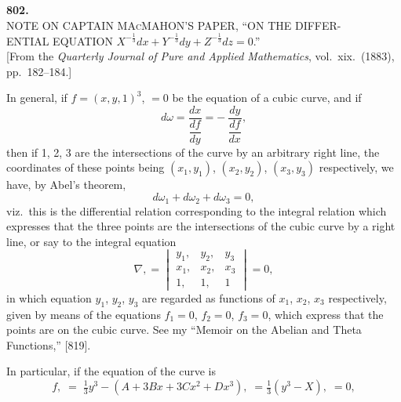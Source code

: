 \documentclass[11pt,a4paper]{article}
\begin{document}
\fancyhead[C]{\small\ }
\fancyhead[R]{\small [802}

\thispagestyle{plain}
\begin{center}
\vspace*{2em}
{\Large\bfseries 802.}\\[1.5em]
{\normalsize\scshape NOTE ON CAPTAIN MAcMAHON'S PAPER, ``ON THE DIFFER-}\\[0.3em]
{\normalsize\scshape ENTIAL EQUATION $X^{-\tfrac{1}{3}}dx + Y^{-\tfrac{1}{3}}dy + Z^{-\tfrac{1}{3}}dz = 0$.''}\\[1em]
{\small [From the \textit{Quarterly Journal of Pure and Applied Mathematics}, vol.~xix.\ (1883), pp.~182--184.]}
\end{center}

\medskip
In general, if $f = (x, y, 1)^{3}$, $= 0$ be the equation of a cubic curve, and if
\[
d\omega = \frac{dx}{\dfrac{df}{dy}} = -\,\frac{dy}{\dfrac{df}{dx}},
\]
then if 1, 2, 3 are the intersections of the curve by an arbitrary right line, the coordinates of these points being $(x_{1}, y_{1})$, $(x_{2}, y_{2})$, $(x_{3}, y_{3})$ respectively, we have, by Abel's theorem,
\[
d\omega_{1} + d\omega_{2} + d\omega_{3} = 0,
\]
viz.\ this is the differential relation corresponding to the integral relation which expresses that the three points are the intersections of the cubic curve by a right line, or say to the integral equation
\[
\nabla, = \begin{vmatrix} y_{1}, & y_{2}, & y_{3}\\ x_{1}, & x_{2}, & x_{3}\\ 1, & 1, & 1 \end{vmatrix} = 0,
\]
in which equation $y_{1}$, $y_{2}$, $y_{3}$ are regarded as functions of $x_{1}$, $x_{2}$, $x_{3}$ respectively, given by means of the equations $f_{1} = 0$, $f_{2} = 0$, $f_{3} = 0$, which express that the points are on the cubic curve. See my ``Memoir on the Abelian and Theta Functions,'' [819].

\medskip
In particular, if the equation of the curve is
\[
f, \;=\; \tfrac{1}{3}y^{3} - (A + 3Bx + 3Cx^{2} + Dx^{3}),\; = \tfrac{1}{3}(y^{3} - X),\; = 0,
\]
\clearpage
\end{document}
